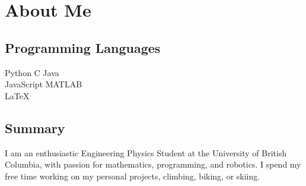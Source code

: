 \documentclass[]{deedy-resume-openfont}
\begin{document}
\section{About Me}
\begin{minipage}[t]{.35\textwidth}
	\subsection{Programming Languages}
	Python \textbullet{} C \textbullet{} Java \\
	JavaScript \textbullet{} MATLAB \\
	\LaTeX
	\sectionsep
\end{minipage}
\hfill
\begin{minipage}[t]{.55\textwidth}
	\subsection{Summary}
	I am an enthusiastic Engineering Physics Student at the University of British Columbia, with passion for mathematics, programming, and robotics. I spend my free time working on my personal projects, climbing, biking, or skiing.

	\vspace{10pt}

\end{minipage}
\end{document}

